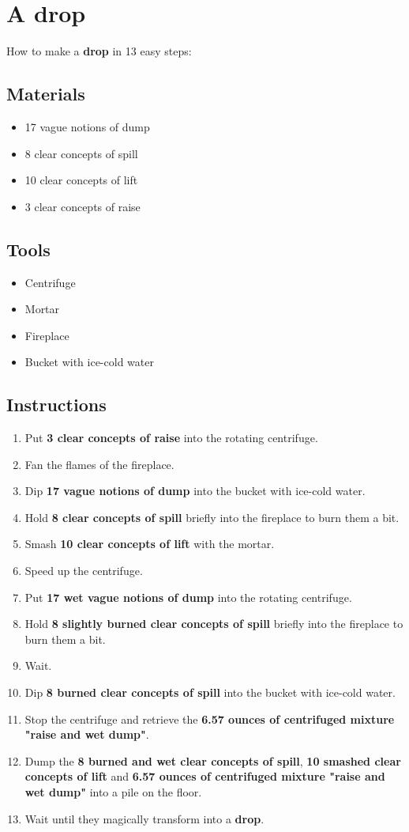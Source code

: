 \documentclass{article}
\begin{document}
\section{A drop}How to make a \textbf{drop} in 13 easy steps:

\subsection{Materials}\begin{itemize}
\item 
17 vague notions of dump
\item 
8 clear concepts of spill
\item 
10 clear concepts of lift
\item 
3 clear concepts of raise
\end{itemize}
\subsection{Tools}\begin{itemize}
\item 
Centrifuge
\item 
Mortar
\item 
Fireplace
\item 
Bucket with ice-cold water
\end{itemize}
\subsection{Instructions}\begin{enumerate}
\item 
Put \textbf{3 clear concepts of raise} into the rotating centrifuge.
\item 
Fan the flames of the fireplace.
\item 
Dip \textbf{17 vague notions of dump} into the bucket with ice-cold water.
\item 
Hold \textbf{8 clear concepts of spill} briefly into the fireplace to burn them a bit.
\item 
Smash \textbf{10 clear concepts of lift} with the mortar.
\item 
Speed up the centrifuge.
\item 
Put \textbf{17 wet vague notions of dump} into the rotating centrifuge.
\item 
Hold \textbf{8 slightly burned clear concepts of spill} briefly into the fireplace to burn them a bit.
\item 
Wait.
\item 
Dip \textbf{8 burned clear concepts of spill} into the bucket with ice-cold water.
\item 
Stop the centrifuge and retrieve the \textbf{6.57 ounces of centrifuged mixture "raise and wet dump"}.
\item 
Dump the \textbf{8 burned and wet clear concepts of spill}, \textbf{10 smashed clear concepts of lift} and \textbf{6.57 ounces of centrifuged mixture "raise and wet dump"} into a pile on the floor.
\item 
Wait until they magically transform into a \textbf{drop}.
\end{enumerate}
\newpage
\end{document}
